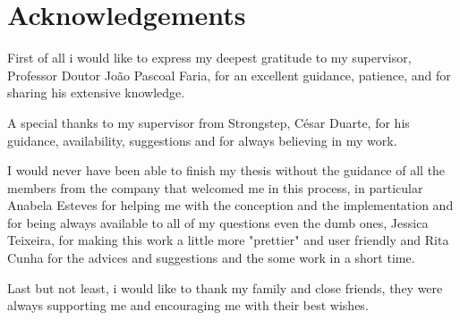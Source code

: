 \chapter*{Acknowledgements}

First of all i would like to express my deepest gratitude to my supervisor, Professor Doutor João Pascoal Faria, for an excellent guidance, patience, and for sharing his extensive knowledge.

A special thanks to my supervisor from Strongstep, César Duarte, for his guidance, availability, suggestions and for always believing in my work.

I would never have been able to finish my thesis without the guidance of all the members from the company that welcomed me in this process, in particular Anabela Esteves for helping me with the conception and the implementation and for being always available to all of my questions even the dumb ones, Jessica Teixeira, for making this work a little more "prettier" and user friendly and Rita Cunha for the advices and suggestions and the some work in a short time.

Last but not least, i would like to thank my family and close friends, they were always supporting me and encouraging me with their best wishes.
\vspace{10mm}
